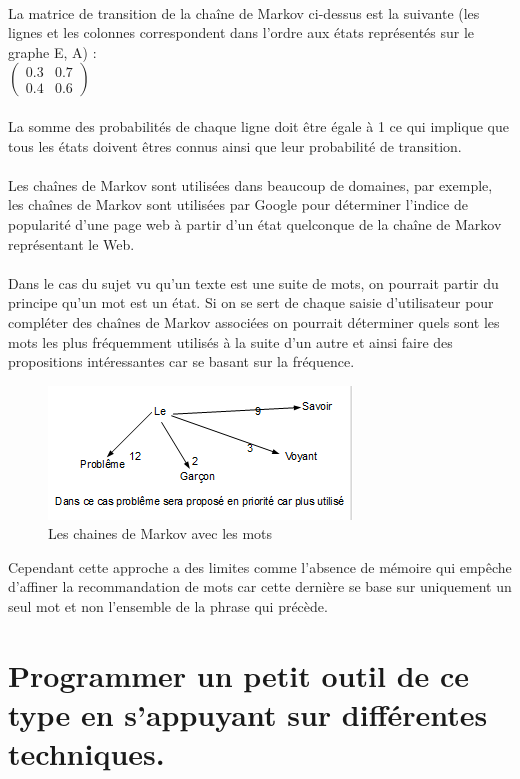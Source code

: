 \documentclass[final, 10pt]{report}
\begin{document}
\\
La matrice de transition de la chaîne de Markov ci-dessus est la suivante (les lignes et les colonnes correspondent dans l'ordre aux états représentés sur le graphe E, A) : 
\\
$\begin{pmatrix}
0.3 & 0.7 \\
0.4 & 0.6
\end{pmatrix}$\\
\\
La somme des probabilités de chaque ligne doit être égale à 1 ce qui implique que tous les états doivent êtres connus ainsi que leur probabilité de transition.\\
\\
Les chaînes de Markov sont utilisées dans beaucoup de domaines, par exemple, les chaînes de Markov sont utilisées par Google pour déterminer l'indice de popularité d'une page web à partir d'un état quelconque de la chaîne de Markov représentant le Web.\\
\\
Dans le cas du sujet vu qu'un texte est une suite de mots, on pourrait partir du principe qu'un mot est un état.
Si on se sert de chaque saisie d'utilisateur pour compléter des chaînes de Markov associées on pourrait déterminer quels sont les mots les plus fréquemment utilisés à la suite d'un autre et ainsi faire des propositions intéressantes car se basant sur la fréquence.
\begin{figure}[h]
    \centering
    \includegraphics[scale=1]{img/Mark.png}
    \caption{Les chaines de Markov avec les mots}
    \label{fig:chaine_markov_word}
\end{figure}

Cependant cette approche a des limites comme l'absence de mémoire qui empêche d'affiner la recommandation de mots car cette dernière se base sur uniquement un seul mot et non l'ensemble de la phrase qui précède.
\chapter{Programmer un petit outil de ce type en s’appuyant sur différentes techniques.}

\printbibliography
\end{document}
